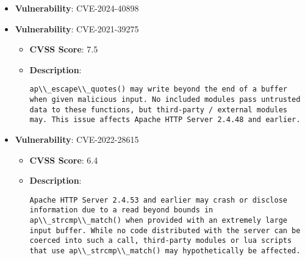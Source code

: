 \documentclass{article}
\begin{document}
\begin{itemize}
        \item \textbf{Vulnerability}: CVE-2024-40898
    
        \item \textbf{Vulnerability}: CVE-2021-39275
        \begin{itemize}
            \item \textbf{CVSS Score}:  7.5 
            \item \textbf{Description}:
            \parbox[t]{0.9\linewidth}{
                \verb|ap\\_escape\\_quotes() may write beyond the end of a buffer when given malicious input. No included modules pass untrusted data to these functions, but third-party / external modules may. This issue affects Apache HTTP Server 2.4.48 and earlier.|
            }
        \end{itemize}
    
        \item \textbf{Vulnerability}: CVE-2022-28615
        \begin{itemize}
            \item \textbf{CVSS Score}:  6.4 
            \item \textbf{Description}:
            \parbox[t]{0.9\linewidth}{
                \verb|Apache HTTP Server 2.4.53 and earlier may crash or disclose information due to a read beyond bounds in ap\\_strcmp\\_match() when provided with an extremely large input buffer. While no code distributed with the server can be coerced into such a call, third-party modules or lua scripts that use ap\\_strcmp\\_match() may hypothetically be affected.|
            }
        \end{itemize}
    

\end{itemize}
\end{document}
